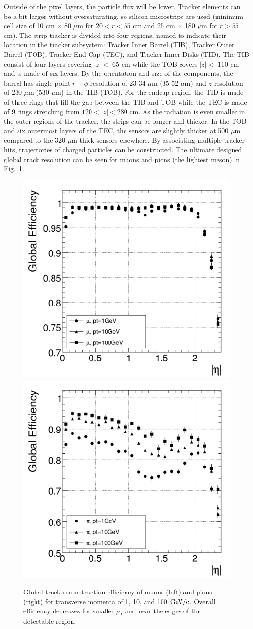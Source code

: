 Outside of the pixel layers, the particle flux will be lower. Tracker elements can be a bit larger without oversaturating, so silicon microstrips are used (minimum cell size of 10 cm $\times$ 80 $\mu$m for $20 < r < 55$ cm and 25 cm $\times$ 180 $\mu$m for $r>55$ cm). The strip tracker is divided into four regions, named to indicate their location in the tracker subsystem: Tracker Inner Barrel (TIB), Tracker Outer Barrel (TOB), Tracker End Cap (TEC), and Tracker Inner Disks (TID). The TIB consist of four layers covering $|z|<$ 65 cm while the TOB covers $|z|<$ 110 cm and is made of six layers. By the orientation and size of the components, the barrel has single-point $r-\phi$ resolution of 23-34 $\mu$m (35-52 $\mu$m) and $z$ resolution of 230 $\mu$m (530 $\mu$m) in the TIB (TOB). For the endcap region, the TID is made of three rings that fill the gap between the TIB and TOB while the TEC is made of 9 rings stretching from $120 < |z| < 280$ cm. As the radiation is even smaller in the outer regions of the tracker, the strips can be longer and thicker. In the TOB and six outermost layers of the TEC, the sensors are slightly thicker at 500 $\mu$m compared to the 320 $\mu$m thick sensors elsewhere. By associating multiple tracker hits, trajectories of charged particles can be constructed. The ultimate designed global track resolution can be seen for muons and pions (the lightest meson) in Fig.~\ref{fig:TrackEfficiency}.

\begin{figure}[htbp]
\begin{center}
\includegraphics[width=.45\linewidth]{Experiment/figures/MuonTrackEfficiency.pdf}
\includegraphics[width=.45\linewidth]{Experiment/figures/PionTrackEfficiency.pdf}
\caption[Global Track Reconstruction Efficiency at CMS]{Global track reconstruction efficiency of muons (left) and pions (right) for transverse momenta of 1, 10, and 100 $\rm{GeV}/c$. Overall efficiency decreases for smaller $p_T$ and near the edges of the detectable region.}
\label{fig:TrackEfficiency}
\end{center}
\end{figure}

